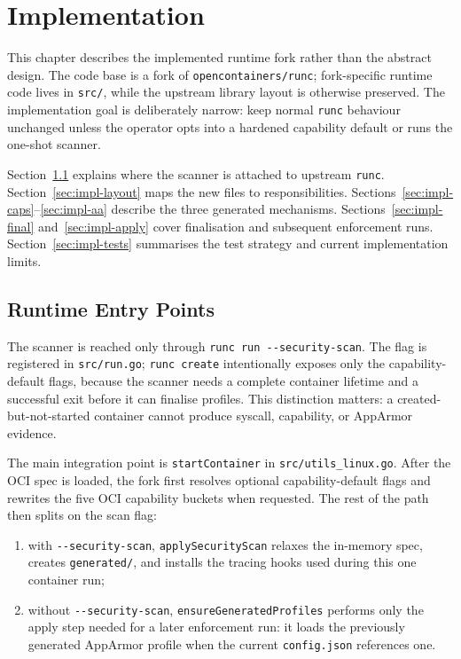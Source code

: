 
\chapter{Implementation}\label{ch:impl}

This chapter describes the implemented runtime fork rather than the abstract design. The code base is a fork of \texttt{opencontainers/runc}; fork-specific runtime code lives in \texttt{src/}, while the upstream library layout is otherwise preserved. The implementation goal is deliberately narrow: keep normal \texttt{runc} behaviour unchanged unless the operator opts into a hardened capability default or runs the one-shot scanner.

Section~\ref{sec:impl-entry} explains where the scanner is attached to upstream \texttt{runc}. Section~\ref{sec:impl-layout} maps the new files to responsibilities. Sections~\ref{sec:impl-caps}--\ref{sec:impl-aa} describe the three generated mechanisms. Sections~\ref{sec:impl-final} and~\ref{sec:impl-apply} cover finalisation and subsequent enforcement runs. Section~\ref{sec:impl-tests} summarises the test strategy and current implementation limits.

\section{Runtime Entry Points}\label{sec:impl-entry}

The scanner is reached only through \texttt{runc run -{}-security-scan}. The flag is registered in \texttt{src/run.go}; \texttt{runc create} intentionally exposes only the capability-default flags, because the scanner needs a complete container lifetime and a successful exit before it can finalise profiles. This distinction matters: a created-but-not-started container cannot produce syscall, capability, or AppArmor evidence.

The main integration point is \texttt{startContainer} in \texttt{src/utils\_linux.go}. After the OCI spec is loaded, the fork first resolves optional capability-default flags and rewrites the five OCI capability buckets when requested. The rest of the path then splits on the scan flag:

\begin{enumerate}
    \item with \texttt{-{}-security-scan}, \texttt{applySecurityScan} relaxes the in-memory spec, creates \texttt{generated/}, and installs the tracing hooks used during this one container run;
    \item without \texttt{-{}-security-scan}, \texttt{ensureGeneratedProfiles} performs only the apply step needed for a later enforcement run: it loads the previously generated AppArmor profile when the current \texttt{config.json} references one.
\end{enumerate}

